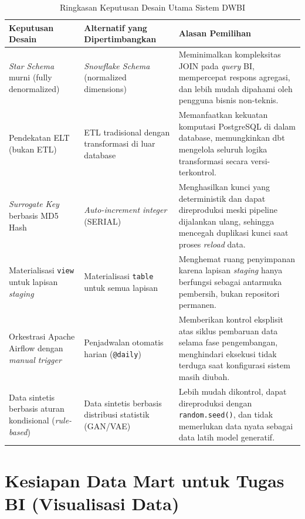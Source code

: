 \begin{table}[H]
\centering
\caption{Ringkasan Keputusan Desain Utama Sistem DWBI}
\small
\begin{tabularx}{\linewidth}{p{3.5cm}p{3.5cm}X}
\toprule
\textbf{Keputusan Desain} & \textbf{Alternatif yang Dipertimbangkan} & \textbf{Alasan Pemilihan} \\
\midrule
\textit{Star Schema} murni (fully denormalized)
  & \textit{Snowflake Schema} (normalized dimensions)
  & Meminimalkan kompleksitas JOIN pada \textit{query} BI, mempercepat respons agregasi, dan lebih mudah dipahami oleh pengguna bisnis non-teknis. \\[4pt]
 
Pendekatan ELT (bukan ETL)
  & ETL tradisional dengan transformasi di luar database
  & Memanfaatkan kekuatan komputasi PostgreSQL di dalam database, memungkinkan dbt mengelola seluruh logika transformasi secara versi-terkontrol. \\[4pt]
 
\textit{Surrogate Key} berbasis MD5 Hash
  & \textit{Auto-increment integer} (SERIAL)
  & Menghasilkan kunci yang deterministik dan dapat direproduksi meski pipeline dijalankan ulang, sehingga mencegah duplikasi kunci saat proses \textit{reload} data. \\[4pt]
 
Materialisasi \texttt{view} untuk lapisan \textit{staging}
  & Materialisasi \texttt{table} untuk semua lapisan
  & Menghemat ruang penyimpanan karena lapisan \textit{staging} hanya berfungsi sebagai antarmuka pembersih, bukan repositori permanen. \\[4pt]
 
Orkestrasi Apache Airflow dengan \textit{manual trigger}
  & Penjadwalan otomatis harian (\texttt{@daily})
  & Memberikan kontrol eksplisit atas siklus pembaruan data selama fase pengembangan, menghindari eksekusi tidak terduga saat konfigurasi sistem masih diubah. \\[4pt]
 
Data sintetis berbasis aturan kondisional (\textit{rule-based})
  & Data sintetis berbasis distribusi statistik (GAN/VAE)
  & Lebih mudah dikontrol, dapat direproduksi dengan \texttt{random.seed()}, dan tidak memerlukan data nyata sebagai data latih model generatif. \\
\bottomrule
\end{tabularx}
\end{table}
 
\section{Kesiapan Data Mart untuk Tugas BI (Visualisasi Data)}
 
